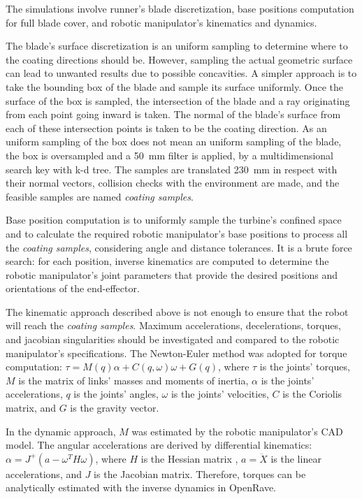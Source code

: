 The simulations involve runner's blade discretization, base
positions computation for full blade cover, and robotic manipulator's kinematics
and dynamics. 

The blade's surface discretization is an uniform sampling to
determine where to the coating directions should be. However, sampling the
actual geometric surface can lead to unwanted results due to possible
concavities. A simpler approach is to take the bounding box of the blade and
sample its surface uniformly. Once the
surface of the box is sampled, the intersection of the blade and a ray
originating from each point going inward is taken. The normal of the blade's
surface from each of these intersection points is taken to be the coating
direction. As an uniform sampling of the box does not mean an uniform sampling
of the blade, the box is oversampled and a 50~mm filter is applied, by a multidimensional search key with k-d tree.
The samples are translated 230~mm in respect with their normal vectors,
collision checks with the environment are made, and the feasible samples are
named \textit{coating samples}. 

Base position computation is to uniformly sample the turbine's
confined space and to calculate the required robotic manipulator's base
positions to process all the \textit{coating samples},  considering angle and
distance tolerances. It is a brute force search: for each position, inverse
kinematics are computed to determine the robotic manipulator's joint parameters that provide
the desired positions and orientations of the end-effector.

The kinematic approach described above is not enough to ensure that the robot
will reach the \textit{coating samples}. Maximum accelerations, decelerations,
torques, and jacobian singularities should be investigated and compared to the robotic
manipulator's specifications. The Newton-Euler method
\cite{sciavicco2000differential} was adopted for torque computation: $\tau =
M(q)\alpha + C(q,\omega)\omega + G(q)$, where $\tau$ is the joints' torques,
$M$ is the matrix of links' masses and moments of inertia, $\alpha$ is the
joints' accelerations, $q$ is the joints' angles, $\omega$ is the joints'
velocities, $C$ is the Coriolis matrix, and $G$ is the gravity vector.

In the dynamic approach, $M$ was estimated by the robotic manipulator's CAD
model. The angular accelerations are derived by differential kinematics:
$\alpha=J^+(a-\omega^TH\omega)$, where $H$ is the Hessian matrix
\cite{hourtash2005kinematic}, $a=\ddot{X}$ is the linear accelerations, and $J$
is the Jacobian matrix. Therefore, torques can be analytically estimated with
the inverse dynamics in OpenRave. 

